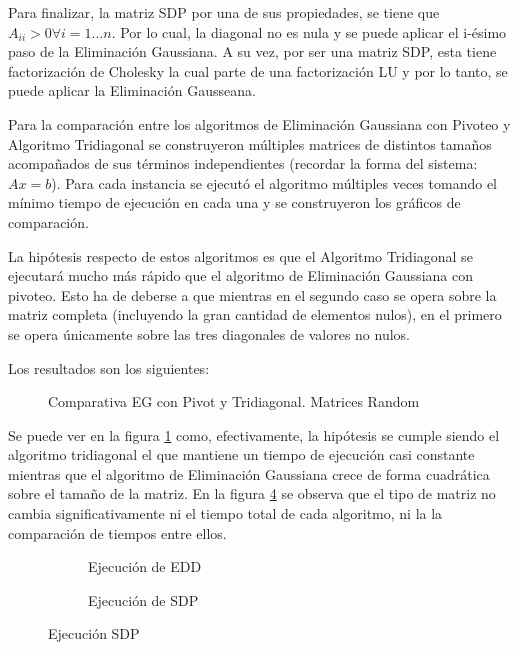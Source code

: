 Para finalizar, la matriz SDP por una de sus propiedades, se tiene que $A_{ii} > 0 \forall i=1\dots n$. 
Por lo cual, la diagonal no es nula y se puede aplicar el i-ésimo paso de la Eliminación Gaussiana. A su vez, por ser una matriz SDP, esta tiene factorización de Cholesky la cual parte de una factorización LU y por lo tanto, se puede aplicar la Eliminación Gausseana.

Para la comparación entre los algoritmos de Eliminación Gaussiana con Pivoteo y Algoritmo Tridiagonal se construyeron múltiples matrices de distintos tamaños acompañados de sus términos independientes (recordar la forma del sistema: $Ax = b$).
Para cada instancia se ejecutó el algoritmo múltiples veces tomando el mínimo tiempo de ejecución en cada una y se construyeron los gráficos de comparación.

La hipótesis respecto de estos algoritmos es que el Algoritmo Tridiagonal se ejecutará mucho más rápido que el algoritmo de Eliminación Gaussiana con pivoteo. Esto ha de deberse a que mientras en el segundo caso se opera sobre la matriz completa (incluyendo la gran cantidad de elementos nulos), en el primero se opera únicamente sobre las tres diagonales de valores no nulos.

Los resultados son los siguientes:

\begin{figure}[H]
   \centering
   
   \caption{Comparativa EG con Pivot y Tridiagonal. Matrices Random}
   \label{fig:4b-tridg-pre-random-1}
\end{figure}


Se puede ver en la figura \ref{fig:4b-tridg-pre-random-1} como, efectivamente, la hipótesis se cumple siendo el algoritmo tridiagonal el que mantiene un tiempo de ejecución casi constante mientras que el algoritmo de Eliminación Gaussiana crece de forma cuadrática sobre el tamaño de la matriz. En la figura \ref{fig:fig_con_sin_pre-1} se observa que el tipo de matriz no cambia significativamente ni el tiempo total de cada algoritmo, ni la la comparación de tiempos entre ellos.

\begin{figure}[H]
   \begin{subfigure}{.5\textwidth}
      \centering
      
      \caption{Ejecución de EDD}
      \label{fig:4b-tridg-pre-edd-1}
   \end{subfigure}%
   \begin{subfigure}{.5\textwidth}
      \centering
      
      \caption{Ejecución de SDP}
      \label{fig:4b-tridg-pre-sdp-1}
   \end{subfigure}
   \caption{Ejecución SDP}
   \label{fig:fig_con_sin_pre-1}
\end{figure}

